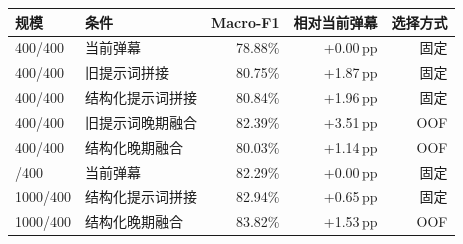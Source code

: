 \begin{tabular}{llrrr}
\toprule
规模 & 条件 & Macro-F1 & 相对当前弹幕 & 选择方式\\
\midrule
400/400 & 当前弹幕 & 78.88\% & +0.00\,pp & 固定\\
400/400 & 旧提示词拼接 & 80.75\% & +1.87\,pp & 固定\\
400/400 & 结构化提示词拼接 & 80.84\% & +1.96\,pp & 固定\\
400/400 & 旧提示词晚期融合 & 82.39\% & +3.51\,pp & OOF\\
400/400 & 结构化晚期融合 & 80.03\% & +1.14\,pp & OOF\\
\addlinespace
1000/400 & 当前弹幕 & 82.29\% & +0.00\,pp & 固定\\
1000/400 & 结构化提示词拼接 & 82.94\% & +0.65\,pp & 固定\\
1000/400 & 结构化晚期融合 & 83.82\% & +1.53\,pp & OOF\\
\bottomrule
\end{tabular}
